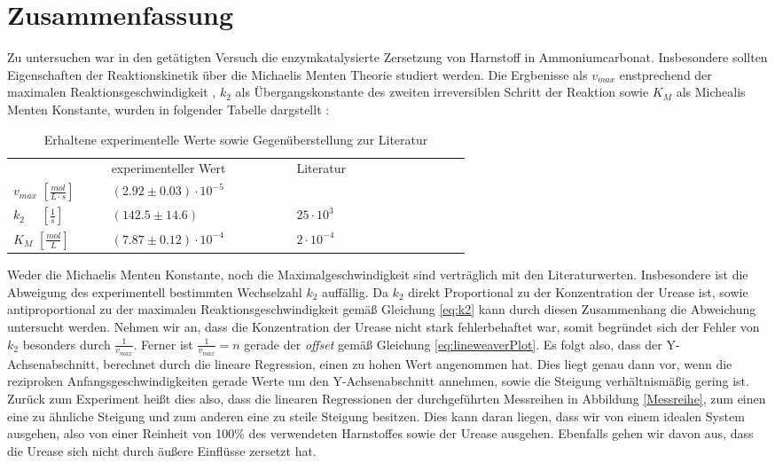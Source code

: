 % 
%
\section{Zusammenfassung}
Zu untersuchen war in den getätigten Versuch die enzymkatalysierte Zersetzung von Harnstoff in Ammoniumcarbonat. Insbesondere sollten Eigenschaften der Reaktionskinetik über die Michaelis Menten Theorie studiert werden. Die Ergbenisse als $v_{max}$ enstprechend der maximalen Reaktionsgeschwindigkeit , $k_2$ als Übergangskonstante des zweiten irreversiblen Schritt der Reaktion sowie $K_M$ als Michealis Menten Konstante, wurden in folgender Tabelle dargstellt :
\begin{table}[H]
	\centering
	\label{Erg}
	\caption{Erhaltene experimentelle Werte sowie Gegenüberstellung zur Literatur}
	\renewcommand*{\arraystretch}{1.4}
	\begin{tabular}{C{0.1\linewidth}|C{0.25\linewidth}C{0.25\linewidth}}
				& experimenteller Wert & Literatur\cite{otto} \\
		$ v_{max}\,\, [\si{\frac{mol}{L\cdot s}}] $ & $(2.92 \pm 0.03) \cdot 10^{-5}$ &   \\
		$k_2\,\,\,\,\,\,\,\, [\si{\frac{1}{s}}]$ & $(142.5 \pm 14.6)\quad \quad$ &  $25 \cdot 10^3$\\
		$K_M\,\, [\si{\frac{mol}{L}}]$& $(7.87 \pm 0.12) \cdot 10^{-4}$& $2 \cdot 10^{-4}$\\
	\end{tabular}
\end{table}
Weder die Michaelis Menten Konstante, noch die Maximalgeschwindigkeit sind verträglich mit den Literaturwerten. Insbesondere ist die Abweigung des experimentell bestimmten Wechselzahl $k_2$ auffällig. Da $k_2$ direkt Proportional zu der Konzentration der Urease ist, sowie antiproportional zu der maximalen Reaktionsgeschwindigkeit gemäß Gleichung \ref{eq:k2} kann durch diesen Zusammenhang die Abweichung untersucht werden. Nehmen wir an, dass die Konzentration der Urease nicht stark fehlerbehaftet war, somit begründet sich der Fehler von $k_2$ besonders durch $\frac{1}{v_{max}}$. Ferner ist $\frac{1}{v_{max}} = n$ gerade der \textit{offset} gemäß Gleichung \ref{eq:lineweaverPlot}. Es folgt also, dass der Y-Achsenabschnitt, berechnet durch die lineare Regression, einen zu hohen Wert angenommen hat. Dies liegt genau dann vor, wenn die reziproken Anfangsgeschwindigkeiten gerade Werte um den Y-Achsenabschnitt annehmen, sowie die Steigung verhältnismäßig gering ist. Zurück zum Experiment heißt dies also, dass die linearen Regressionen der durchgeführten Messreihen in Abbildung \ref{Messreihe}, zum einen eine zu ähnliche Steigung und zum anderen eine zu steile Steigung besitzen. Dies kann daran liegen, dass wir von einem idealen System ausgehen, also von einer Reinheit von 100\% des verwendeten Harnstoffes sowie der Urease ausgehen. Ebenfalls gehen wir davon aus, dass die Urease sich nicht durch äußere Einflüsse zersetzt hat. 

%


